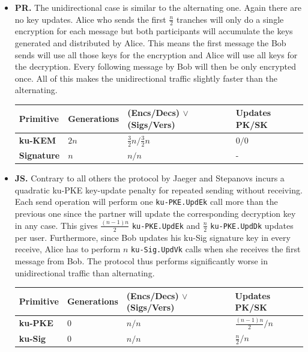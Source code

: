 \documentclass[11pt,a4paper,twoside,openright,bibliography=totoc]{scrbook}
\begin{document}
\begin{itemize}
\item \textbf{PR.} The unidirectional case is similar to the alternating
  one. Again there are no key updates. Alice who sends the first
  $\frac{n}{2}$ tranches will only do a single encryption for
  each message but both participants will accumulate the keys
  generated and distributed by Alice. This means the first
  message the Bob sends will use all those keys for the encryption
  and Alice will use all keys for the decryption. Every following
  message by Bob will then be only encrypted once. All of this
  makes the unidirectional traffic slightly faster than the alternating.
  \begin{center}
    \begin{tabular}{ | l | l | l | l |}
    \hline
    Primitive & Generations & (Encs/Decs) $\vee$ (Sigs/Vers) & Updates PK/SK \\ \hline
    \textbf{ku-KEM} & $2n$ & $\frac{3}{2}n/\frac{3}{2}n$ & $0/0$ \\ \hline
    \textbf{Signature} & $n$ & $n/n$ & - \\  
    \hline
    \end{tabular}
  \end{center}
\item  \textbf{JS.} Contrary to all others the protocol by Jaeger and Stepanovs incurs a
  quadratic ku-PKE key-update penalty for repeated sending without receiving.
  Each send operation will perform one \texttt{ku-PKE.UpdEk} call more than the previous
  one since the partner will update the corresponding decryption key
  in any case. This gives $\frac{(n-1)n}{2}$ \texttt{ku-PKE.UpdEk} and
  $\frac{n}{2}$ \texttt{ku-PKE.UpdDk} updates per user. Furthermore,
  since Bob updates his ku-Sig signature key in every receive, Alice
  has to perform $n$ \texttt{ku-Sig.UpdVk} calls when she receives the
  first message from Bob. The protocol thus performs significantly worse in unidirectional
  traffic than alternating.
  \begin{center}
    \begin{tabular}{ | l | l | l | l |}
    \hline
    Primitive & Generations & (Encs/Decs) $\vee$ (Sigs/Vers) & Updates PK/SK \\ \hline
    \textbf{ku-PKE} & $0$ & $n/n$ & $\frac{(n-1)n}{2}/n$ \\ \hline
    \textbf{ku-Sig} & $0$ & $n/n$ & $\frac{n}{2}/n$ \\  
    \hline
    \end{tabular}
  \end{center}

\end{itemize}
\end{document}
